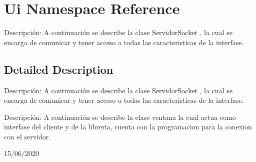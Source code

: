 \hypertarget{namespace_ui}{}\section{Ui Namespace Reference}
\label{namespace_ui}


Descripción\+: A continuación se describe la clase Servidor\+Socket , la cual se encarga de comunicar y tener acceso a todas las caracteristicas de la interfase.  




\subsection{Detailed Description}
Descripción\+: A continuación se describe la clase Servidor\+Socket , la cual se encarga de comunicar y tener acceso a todas las caracteristicas de la interfase. 

Descripción\+: A continuación se describe la clase ventana la cual actua como interfase del cliente y de la libreria, cuenta con la programacion para la conexion con el servidor.

15/06/2020 